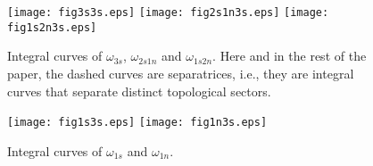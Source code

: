 \documentclass[a4paper, 12pt]{article}
\theoremstyle{definition}
\numberwithin{equation}{section}
\begin{document}
\begin{figure}[!ht]
\centering
\texttt{[image: fig3s3s.eps]}
\hspace{1mm}
\texttt{[image: fig2s1n3s.eps]}
\hspace{1mm}
\texttt{[image: fig1s2n3s.eps]}
\caption{Integral curves of
$\omega_{3s}$, $\omega_{2s1n}$ and $\omega_{1s2n}$.
Here and in the rest of the paper, 
the dashed curves are separatrices, 
i.e., they are integral curves 
that separate distinct topological sectors. 
}
\label{fig:2}
\end{figure}

\begin{figure}[!ht]
\centering
\texttt{[image: fig1s3s.eps]}
\hspace{1mm}
\texttt{[image: fig1n3s.eps]}
\caption{Integral curves of
$\omega_{1s}$ and $\omega_{1n}$.}
\label{fig:3}
\end{figure}
\end{document}
